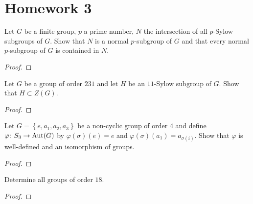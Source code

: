 \section{Homework 3}
\setcounter{exercise}{0}
\setcounter{equation}{0}
\begin{problem}
Let $G$ be a finite group, $p$ a prime number, $N$ the intersection of all
$p$-Sylow subgroups of $G$. Show that $N$ is a normal $p$-subgroup of $G$
and that every normal $p$-subgroup of $G$ is contained in $N$.
\end{problem}
\begin{proof}
\end{proof}

\begin{problem}
Let $G$ be a group of order $231$ and let $H$ be an $11$-Sylow subgroup of
$G$. Show that $H\subset Z(G)$.
\end{problem}
\begin{proof}
\end{proof}

\begin{problem}
Let $G=\left\{e,a_1,a_2,a_3\right\}$ be a non-cyclic group of order $4$ and
define $\varphi\colon S_3\to\operatorname{Aut}(G)$ by $\varphi(\sigma)(e)=e$ and
$\varphi(\sigma)(a_1)=a_{\sigma(i)}$. Show that $\varphi$ is well-defined and an
isomorphism of groups.
\end{problem}
\begin{proof}
\end{proof}

\begin{problem}
Determine all groups of order $18$.
\end{problem}
\begin{proof}
\end{proof}

